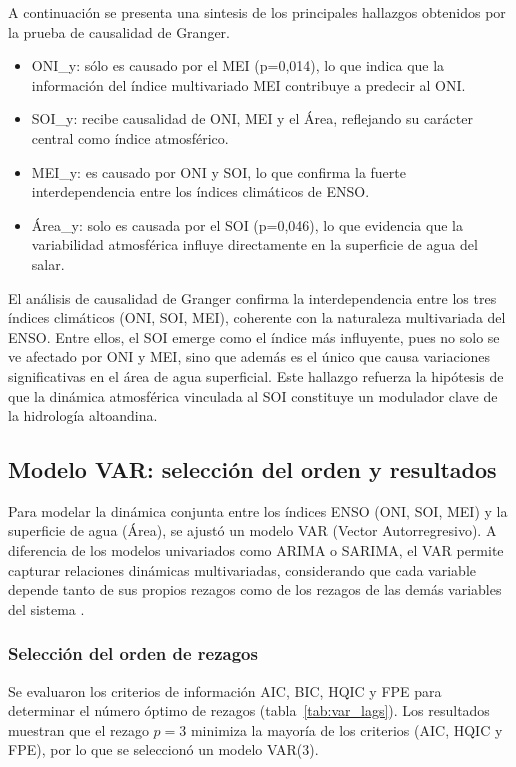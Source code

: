 A continuación se presenta una sintesis de los principales hallazgos obtenidos por la prueba de causalidad de Granger.
\begin{itemize}
    \item ONI\_y: sólo es causado por el MEI (p=0,014), lo que indica que la información del índice multivariado MEI contribuye a predecir al ONI.
    \item SOI\_y: recibe causalidad de ONI, MEI y el Área, reflejando su carácter central como índice atmosférico.
    \item MEI\_y: es causado por ONI y SOI, lo que confirma la fuerte interdependencia entre los índices climáticos de ENSO.
    \item Área\_y: solo es causada por el SOI (p=0,046), lo que evidencia que la variabilidad atmosférica influye directamente en la superficie de agua del salar.
\end{itemize}


El análisis de causalidad de Granger confirma la interdependencia entre los tres índices climáticos (ONI, SOI, MEI), coherente con la naturaleza multivariada del ENSO. Entre ellos, el SOI emerge como el índice más influyente, pues no solo se ve afectado por ONI y MEI, sino que además es el único que causa variaciones significativas en el área de agua superficial. Este hallazgo refuerza la hipótesis de que la dinámica atmosférica vinculada al SOI constituye un modulador clave de la hidrología altoandina.

\subsection{Modelo VAR: selección del orden y resultados}

Para modelar la dinámica conjunta entre los índices ENSO (ONI, SOI, MEI) y la superficie de agua (Área), se ajustó un modelo VAR (Vector Autorregresivo). A diferencia de los modelos univariados como ARIMA o SARIMA, el VAR permite capturar relaciones dinámicas multivariadas, considerando que cada variable depende tanto de sus propios rezagos como de los rezagos de las demás variables del sistema \cite{lutkepohl2005new}.

\subsubsection{Selección del orden de rezagos}
Se evaluaron los criterios de información AIC, BIC, HQIC y FPE para determinar el número óptimo de rezagos (tabla~\ref{tab:var_lags}). Los resultados muestran que el rezago $p=3$ minimiza la mayoría de los criterios (AIC, HQIC y FPE), por lo que se seleccionó un modelo VAR(3).

